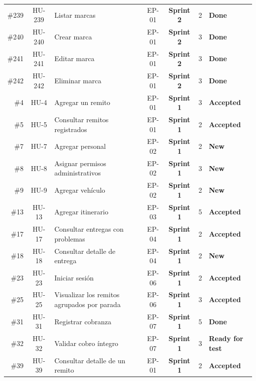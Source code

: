 \documentclass[a4paper,9pt]{article}
\begin{document}
\begin{longtable}{r c p{8.2cm} c c c l}
\#239 & HU-239 & Listar marcas & EP-01 & \textbf{Sprint 2} & 2 & \textcolor{slatestatus}{\textbf{Done}} \\
\#240 & HU-240 & Crear marca & EP-01 & \textbf{Sprint 2} & 3 & \textcolor{slatestatus}{\textbf{Done}} \\
\#241 & HU-241 & Editar marca & EP-01 & \textbf{Sprint 2} & 3 & \textcolor{slatestatus}{\textbf{Done}} \\
\#242 & HU-242 & Eliminar marca & EP-01 & \textbf{Sprint 2} & 3 & \textcolor{slatestatus}{\textbf{Done}} \\
\#4 & HU-4 & Agregar un remito & EP-01 & \textbf{Sprint 1} & 3 & \textcolor{tealstatus}{\textbf{Accepted}} \\
\#5 & HU-5 & Consultar remitos registrados & EP-01 & \textbf{Sprint 1} & 2 & \textcolor{tealstatus}{\textbf{Accepted}} \\
\#7 & HU-7 & Agregar personal & EP-02 & \textbf{Sprint 1} & 2 & \textcolor{bluestatus}{\textbf{New}} \\
\#8 & HU-8 & Asignar permisos administrativos & EP-02 & \textbf{Sprint 1} & 3 & \textcolor{bluestatus}{\textbf{New}} \\
\#9 & HU-9 & Agregar vehículo & EP-02 & \textbf{Sprint 1} & 2 & \textcolor{bluestatus}{\textbf{New}} \\
\#13 & HU-13 & Agregar itinerario & EP-03 & \textbf{Sprint 1} & 5 & \textcolor{tealstatus}{\textbf{Accepted}} \\
\#17 & HU-17 & Consultar entregas con problemas & EP-04 & \textbf{Sprint 1} & 2 & \textcolor{tealstatus}{\textbf{Accepted}} \\
\#18 & HU-18 & Consultar detalle de entrega & EP-04 & \textbf{Sprint 1} & 2 & \textcolor{bluestatus}{\textbf{New}} \\
\#23 & HU-23 & Iniciar sesión & EP-06 & \textbf{Sprint 1} & 2 & \textcolor{tealstatus}{\textbf{Accepted}} \\
\#25 & HU-25 & Visualizar los remitos agrupados por parada & EP-06 & \textbf{Sprint 1} & 3 & \textcolor{tealstatus}{\textbf{Accepted}} \\
\#31 & HU-31 & Registrar cobranza & EP-07 & \textbf{Sprint 1} & 5 & \textcolor{slatestatus}{\textbf{Done}} \\
\#32 & HU-32 & Validar cobro íntegro & EP-07 & \textbf{Sprint 1} & 3 & \textcolor{amberstatus}{\textbf{Ready for test}} \\
\#39 & HU-39 & Consultar detalle de un remito & EP-01 & \textbf{Sprint 1} & 2 & \textcolor{tealstatus}{\textbf{Accepted}} \\

\end{longtable}
\end{document}
